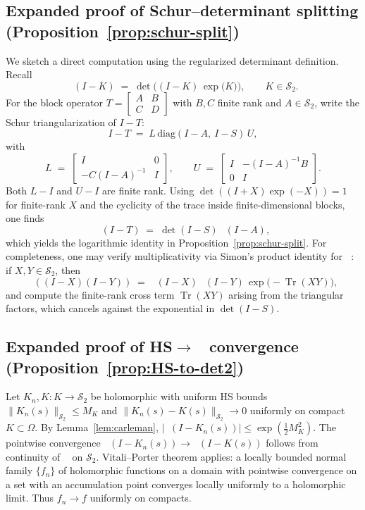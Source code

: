 \documentclass[11pt]{article}
\theoremstyle{remark}
\newcommand{\C}{\mathbb{C}}
\newcommand{\HS}{\mathcal{S}_2}
\DeclareMathOperator{\Tr}{Tr}
\DeclareMathOperator{\dettwo}{det_2}
\begin{document}
\subsection{Expanded proof of Schur--determinant splitting (Proposition~\ref{prop:schur-split})}
We sketch a direct computation using the regularized determinant definition. Recall
\[
 \dettwo(I-K)\;=\;\det\!\Big((I-K)\,\exp\big(K\big)\Big),\qquad K\in\HS.
\]
For the block operator \(T=\begin{bmatrix}A&B\\C&D\end{bmatrix}\) with \(B,C\) finite rank and \(A\in\HS\), write the Schur triangularization of \(I-T\):
\[
 I-T\;=\;L\,\mathrm{diag}(I-A,\ I-S)\,U,
\]
with
\[
 L\;=\;\begin{bmatrix}I & 0\\ -C(I-A)^{-1} & I\end{bmatrix},\qquad U\;=\;\begin{bmatrix}I & -(I-A)^{-1}B\\ 0 & I\end{bmatrix}.
\]
Both \(L-I\) and \(U-I\) are finite rank. Using \(\det((I+X)\exp(-X))=1\) for finite-rank \(X\) and the cyclicity of the trace inside finite-dimensional blocks, one finds
\[
 \dettwo(I-T)\;=\;\det(I-S)\,\dettwo(I-A),
\]
which yields the logarithmic identity in Proposition~\ref{prop:schur-split}. For completeness, one may verify multiplicativity via Simon's product identity for \(\dettwo\): if \(X,Y\in\HS\), then
\[
 \dettwo((I-X)(I-Y))\;=\;\dettwo(I-X)\,\dettwo(I-Y)\,\exp\!\big(-\Tr(XY)\big),
\]
and compute the finite-rank cross term \(\Tr(XY)\) arising from the triangular factors, which cancels against the exponential in \(\det(I-S)\).

\subsection{Expanded proof of HS\(\to\)\(\dettwo\) convergence (Proposition~\ref{prop:HS-to-det2})}
Let \(K_n,K:K\to\HS\) be holomorphic with uniform HS bounds \(\|K_n(s)\|_{\HS}\le M_K\) and \(\|K_n(s)-K(s)\|_{\HS}\to 0\) uniformly on compact \(K\subset\Omega\). By Lemma~\ref{lem:carleman}, \(|\dettwo(I-K_n(s))|\le \exp(\tfrac12 M_K^2)\). The pointwise convergence \(\dettwo(I-K_n(s))\to \dettwo(I-K(s))\) follows from continuity of \(\dettwo\) on \(\HS\). Vitali--Porter theorem applies: a locally bounded normal family \(\{f_n\}\) of holomorphic functions on a domain with pointwise convergence on a set with an accumulation point converges locally uniformly to a holomorphic limit. Thus \(f_n\to f\) uniformly on compacts.
\end{document}
